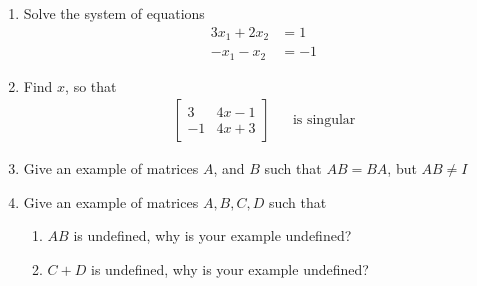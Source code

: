 \documentclass[12pt]{article}
\begin{document}
\begin{enumerate}
\item Solve the system of equations
\begin{align*}
    3x_1+2x_2 &= 1 \\
    -x_1-x_2 &= -1
\end{align*}
\vspace{3.0cm}

\item Find $x$, so that
\begin{align*}
	\begin{bmatrix}
		3 & 4x-1 \\
		-1 & 4x+3
	\end{bmatrix} & 
	&\text{is singular}
\end{align*}
\vspace{3.0cm}

\item Give an example of matrices $A$, and $B$ such that $AB=BA$, but $AB \neq I$
\vspace{3.0cm}

\item Give an example of matrices $A, B, C, D$ such that
\begin{enumerate}
	\item $AB$ is undefined, why is your example undefined?
	\vspace{3.0cm}
	
	\item $C+D$ is undefined, why is your example undefined?
\end{enumerate}
    
\end{enumerate}
\end{document}
